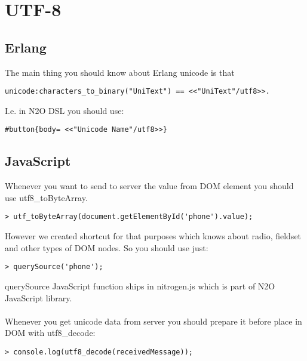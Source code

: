 \section{UTF-8}

\subsection{Erlang}

The main thing you should know about Erlang unicode is that

\vspace{1\baselineskip}
\begin{lstlisting}
unicode:characters_to_binary("UniText") == <<"UniText"/utf8>>.
\end{lstlisting}
\vspace{1\baselineskip}

I.e. in N2O DSL you should use:

\vspace{1\baselineskip}
\begin{lstlisting}
#button{body= <<"Unicode Name"/utf8>>}
\end{lstlisting}
\vspace{1\baselineskip}

\subsection{JavaScript}

Whenever you want to send to server the value from DOM element
you should use utf8\_toByteArray.

\vspace{1\baselineskip}
\begin{lstlisting}
> utf_toByteArray(document.getElementById('phone').value);
\end{lstlisting}
\vspace{1\baselineskip}

However we created shortcut for that purposes which knows
about radio, fieldset and other types of DOM nodes. So you should use just:

\vspace{1\baselineskip}
\begin{lstlisting}
> querySource('phone');
\end{lstlisting}
\vspace{1\baselineskip}

querySource JavaScript function ships in nitrogen.js which is part
of N2O JavaScript library.

\paragraph{}
Whenever you get unicode data from server you should prepare it before place
in DOM with utf8\_decode:

\vspace{1\baselineskip}
\begin{lstlisting}
> console.log(utf8_decode(receivedMessage));
\end{lstlisting}
\vspace{1\baselineskip}
